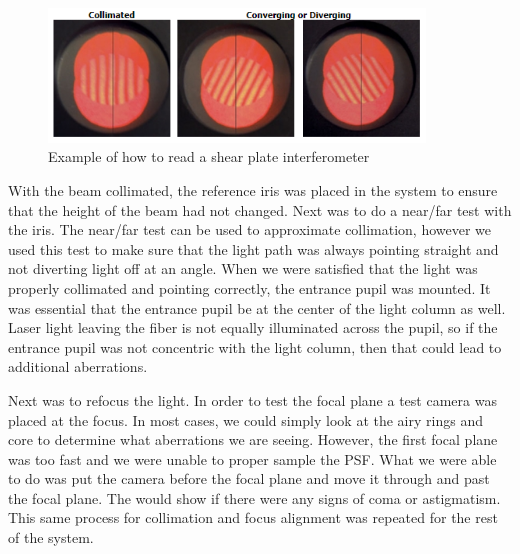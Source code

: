 \begin{figure}[H]
    \centering
    \includegraphics[width = 10cm]{Figures/shear_coll.png}
    \caption{Example of how to read a shear plate interferometer \cite{ShearingInterferometers}}
    \label{fig:shear_read}
\end{figure}

With the beam collimated, the reference iris was placed in the system to ensure that the height of the beam had not changed.  Next was to do a near/far test with the iris.  The near/far test can be used to approximate collimation, however we used this test to make sure that the light path was always pointing straight and not diverting light off at an angle.  When we were satisfied that the light was properly collimated and pointing correctly, the entrance pupil was mounted.  It was essential that the entrance pupil be at the center of the light column as well.  Laser light leaving the fiber is not equally illuminated across the pupil, so if the entrance pupil was not concentric with the light column, then that could lead to additional aberrations.

Next was to refocus the light.  In order to test the focal plane a test camera was placed at the focus.  In most cases, we could simply look at the airy rings and core to determine what aberrations we are seeing.  However, the first focal plane was too fast and we were unable to proper sample the PSF.  What we were able to do was put the camera before the focal plane and move it through and past the focal plane.  The would show if there were any signs of coma or astigmatism.  This same process for collimation and focus alignment was repeated for the rest of the system.  

